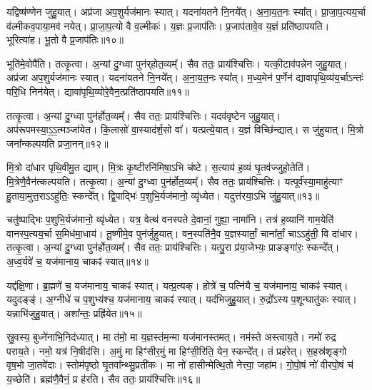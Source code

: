 यद्विष्ष॑ण्णेन जुहु॒यात्।
अप्र॑जा अप॒शुर्यज॑मानः स्यात्।
यदना॑यतने नि॒नये᳚त्।
अ॒ना॒य॒त॒नः स्या᳚त्।
प्रा॒जा॒प॒त्यय॒र्चा व॑ल्मीकव॒पाया॒मव॑ नयेत्।
प्रा॒जा॒प॒त्यो वै व॒ल्मीकः॑।
य॒ज्ञः प्र॒जा\-प॑तिः।
प्र॒जा\-प॑तावे॒व य॒ज्ञं प्रति॑\-ष्ठापयति।
भूरित्या॑ह।
भू॒तो वै प्र॒जा\-प॑तिः॥१०॥\ip

भूति॑मे॒वोपै॑ति।
तत्कृ॒त्वा।
अ॒न्यां दु॒ग्ध्वा पुन॑र्‌\mbox{}होत॒व्यम्᳚।
सैव ततः॒ प्राय॑श्चित्तिः।
यत्की॒टाव॑पन्नेन जुहु॒यात्।
अप्र॑जा अप॒शुर्यज॑मानः स्यात्।
यदना॑यतने नि॒नये᳚त्।
अ॒ना॒य॒त॒नः स्या᳚त्।
म॒ध्य॒मेन॑ प॒र्णेन॑ द्यावापृथि॒व्य॑य॒र्चा\-ऽन्तः॑ परि॒धि निन॑येत्।
द्यावा॑पृथि॒व्योरे॒वैन॒त्प्रति॑\-ष्ठापयति॥११॥\ip

तत्कृ॒त्वा।
अ॒न्यां दु॒ग्ध्वा पुन॑र्\mbox{}होत॒व्यम्᳚।
सैव ततः॒ प्राय॑श्चित्तिः।
यदव॑वृष्टेन जुहु॒यात्।
अप॑रूपमस्या॒ऽ॒ऽ॒त्मञ्जा॑येत।
कि॒लासो॑ वा॒स्याद॑र्\mbox{}श॒सो वा᳚।
यत्प्रत्ये॒यात्।
य॒ज्ञं वि\-च्छि॑न्द्यात्।
स जु॑हुयात्।
मि॒त्रो जना᳚न्कल्पयति प्रजा॒नन्॥१२॥\ip

मि॒त्रो दा॑धार पृथि॒वीमु॒त द्याम्।
मि॒त्रः कृ॒ष्टीरनि॑मिषा॒ऽभि च॑ष्टे।
स॒त्याय॑ ह॒व्यं घृ॒तव॑ज्जुहो॒तेति॑।
मि॒त्रेणै॒वैन॑त्कल्पयति।
तत्कृ॒त्वा।
अ॒न्यां दु॒ग्ध्वा पुन॑र्\mbox{}होत॒व्यम्᳚।
सैव ततः॒ प्राय॑श्चित्तिः।
यत्पूर्व॑स्या॒माहु॑त्याꣳ हु॒ताया॒मुत्त॒रा\-ऽऽहु॑तिः॒ स्कन्दे᳚त्।
द्वि॒पाद्भिः॑ प॒शुभि॒र्यज॑मानो॒ व्यृ॑ध्येत।
यदुत्त॑रया॒ऽभि जु॑हु॒यात्॥१३॥\ip

चतु॑ष्पाद्भिः प॒शुभि॒र्यज॑मानो॒ व्यृ॑ध्येत।
यत्र॒ वेत्थ॑ वनस्पते दे॒वानां॒ गुह्या॒ नामा॑नि।
तत्र॑ ह॒व्यानि॑ गाम॒येति॑ वानस्प॒त्यय॒र्चा स॒मिध॑मा॒धाय॑।
तू॒ष्णीमे॒व पुन॑र्जुहुयात्।
वन॒स्पति॑नै॒व य॒ज्ञस्यार्तां॒ चाना᳚र्तां॒ चाऽऽहु॑ती॒ वि दा॑धार।
तत्कृ॒त्वा।
अ॒न्यां दु॒ग्ध्वा पुन॑र्\mbox{}होत॒व्यम्᳚।
सैव ततः॒ प्राय॑श्चित्तिः।
यत्पु॒रा प्र॑या॒जेभ्यः॒ प्राङङ्गा॑रः॒ स्कन्दे᳚त्।
अ॒ध्व॒र्यवे॑ च॒ यज॑मानाय॒ चाकꣴ॑ स्यात्॥१४॥\ip

यद्द॑क्षि॒णा।
ब्र॒ह्मणे॑ च॒ यज॑मानाय॒ चाकꣴ॑ स्यात्।
यत्प्र॒त्यक्।
होत्रे॑ च॒ पत्नि॑यै च॒ यज॑मानाय॒ चाकꣴ॑ स्यात्।
यदुदङ्ङ्॑।
अ॒ग्नीधे॑ च प॒शुभ्य॑श्च॒ यज॑मानाय॒ चाकꣴ॑ स्यात्।
यद॑भिजुहु॒यात्।
रु॒द्रो᳚ऽस्य प॒शून्घातु॑कः स्यात्।
यन्नाभि॑जुहु॒यात्।
अशा᳚न्तः॒ प्रह्रि॑येत॥१५॥\ip

स्रु॒वस्य॒ बुध्ने॑नाभि॒निद॑ध्यात्।
मा त॑मो॒ मा य॒ज्ञस्त॑म॒न्मा यज॑मानस्तमत्।
नम॑स्ते अस्त्वाय॒ते।
नमो॑ रुद्र पराय॒ते।
नमो॒ यत्र॑ नि॒षीद॑सि।
अ॒मुं मा हिꣳ॑सीर॒मुं मा हिꣳ॑सी॒रिति॒ येन॒ स्कन्दे᳚त्।
तं प्रह॑रेत्।
स॒हस्र॑शृङ्गो वृष॒भो जा॒तवे॑दाः।
स्तोम॑पृष्ठो घृ॒तवा᳚न्थ्सु॒प्रती॑कः।
मा नो॑ हासीन्मेत्थि॒तो नेत्त्वा॒ जहा॑म।
गो॒पो॒षं नो॑ वीरपो॒षं च॑ य॒च्छेति॑।
ब्रह्म॑णै॒वैनं॒ प्र ह॑रति।
सैव ततः॒ प्राय॑श्चित्तिः॥१६॥\ip{}

